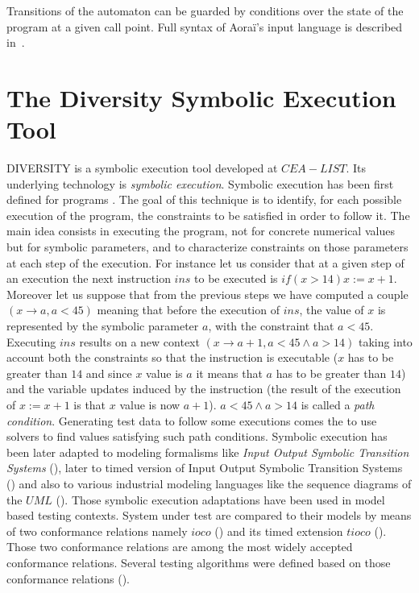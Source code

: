 Transitions of the automaton can be guarded by conditions over the state of the
program at a given call point. Full syntax of Aora\"i's input language is 
described in~\cite{aorai}.




\section{The Diversity Symbolic Execution Tool}


DIVERSITY is a symbolic execution tool developed at $CEA-LIST$. Its
underlying technology is {\em symbolic execution}.  Symbolic execution
has been first defined for programs \cite{King75,Clarke,Rama}. The
goal of this technique is to identify, for each possible execution of
the program, the constraints to be satisfied in order to follow it.
The main idea consists in executing the program, not for concrete
numerical values but for symbolic parameters, and to characterize
constraints on those parameters at each step of the execution.  For
instance let us consider that at a given step of an execution the next
instruction $ins$ to be executed is $if(x>14) x:=x+1$. Moreover let us
suppose that from the previous steps we have computed a couple
$(x\rightarrow a, a<45)$ meaning that before the execution of $ins$,
the value of $x$ is represented by the symbolic parameter $a$, with
the constraint that $a<45$. Executing $ins$ results on a new context
$(x\rightarrow a+1 , a<45 \land a>14)$ taking into account both the
constraints so that the instruction is executable ($x$ has to be
greater than $14$ and since $x$ value is $a$ it means that $a$ has to
be greater than $14$) and the variable updates induced by the
instruction (the result of the execution of $x:=x+1$ is that $x$ value
is now $a+1$). $a<45 \land a>14$ is called a {\em path
  condition}. Generating test data to follow some executions comes the
to use solvers to find values satisfying such path conditions.
Symbolic execution has been later adapted to modeling formalisms like
{\em Input Output Symbolic Transition Systems} (\cite{RGLG03,GAL00}),
later to timed version of Input Output Symbolic Transition Systems
(\cite{EGL11,BEGL12}) and also to various industrial modeling
languages like the {sequence diagrams} of the $UML$
(\cite{BGS11}). Those symbolic execution adaptations have been used in
model based testing contexts. System under test are compared to their
models by means of two conformance relations namely {\em $ioco$}
(\cite{Tre96a}) and its timed extension {\em $tioco$}
(\cite{Kri04}). Those two conformance relations are among the most
widely accepted conformance relations. Several testing algorithms were
defined based on those conformance relations (\cite{GLRT06, EGL11,
  BEGL12}).

